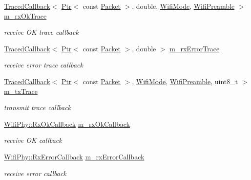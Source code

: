 \begin{DoxyCompactItemize}
\hyperlink{classns3_1_1TracedCallback}{Traced\+Callback}$<$ \hyperlink{classns3_1_1Ptr}{Ptr}$<$ const \hyperlink{classns3_1_1Packet}{Packet} $>$, double, \hyperlink{classns3_1_1WifiMode}{Wifi\+Mode}, \hyperlink{group__wifi_ga5e94a56cb338a14ffbbb19c6a41251eb}{Wifi\+Preamble} $>$ \hyperlink{classns3_1_1WifiPhyStateHelper_a97095d8d63198458c97879945be8c013}{m\+\_\+rx\+Ok\+Trace}
\begin{DoxyCompactList}\small\item\em receive OK trace callback \end{DoxyCompactList}\item 
\hyperlink{classns3_1_1TracedCallback}{Traced\+Callback}$<$ \hyperlink{classns3_1_1Ptr}{Ptr}$<$ const \hyperlink{classns3_1_1Packet}{Packet} $>$, double $>$ \hyperlink{classns3_1_1WifiPhyStateHelper_ab82112241adc383713faaf87df97e894}{m\+\_\+rx\+Error\+Trace}
\begin{DoxyCompactList}\small\item\em receive error trace callback \end{DoxyCompactList}\item 
\hyperlink{classns3_1_1TracedCallback}{Traced\+Callback}$<$ \hyperlink{classns3_1_1Ptr}{Ptr}$<$ const \hyperlink{classns3_1_1Packet}{Packet} $>$, \hyperlink{classns3_1_1WifiMode}{Wifi\+Mode}, \hyperlink{group__wifi_ga5e94a56cb338a14ffbbb19c6a41251eb}{Wifi\+Preamble}, uint8\+\_\+t $>$ \hyperlink{classns3_1_1WifiPhyStateHelper_a5e1f9dd965eb7d83ffd469c15e54364b}{m\+\_\+tx\+Trace}
\begin{DoxyCompactList}\small\item\em transmit trace callback \end{DoxyCompactList}\item 
\hyperlink{classns3_1_1WifiPhy_a8fc4f4e9b9bd7ef70dd8b050ae2e3188}{Wifi\+Phy\+::\+Rx\+Ok\+Callback} \hyperlink{classns3_1_1WifiPhyStateHelper_a599b8a5ed7f99f78251a2938ca326957}{m\+\_\+rx\+Ok\+Callback}
\begin{DoxyCompactList}\small\item\em receive OK callback \end{DoxyCompactList}\item 
\hyperlink{classns3_1_1WifiPhy_af6e035a7c603eec7eae9b9365b13742e}{Wifi\+Phy\+::\+Rx\+Error\+Callback} \hyperlink{classns3_1_1WifiPhyStateHelper_a009487ed03ffc0c7d751e13bbca3238e}{m\+\_\+rx\+Error\+Callback}
\begin{DoxyCompactList}\small\item\em receive error callback \end{DoxyCompactList}\end{DoxyCompactItemize}
